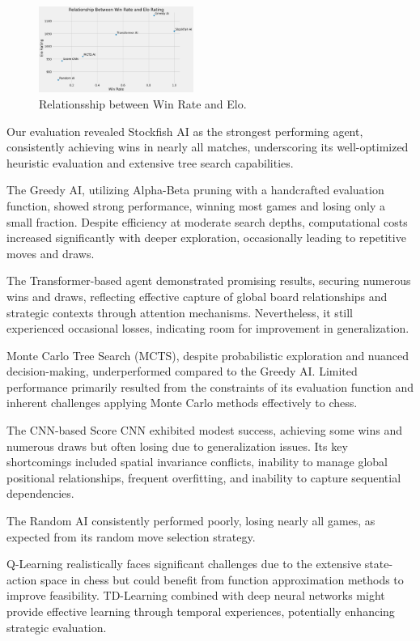 \documentclass[journal, a4paper]{IEEEtran}
\begin{document}
\begin{figure}[H]
    \centering
    \includegraphics[width=0.45\textwidth]{fig/winrate_elo.png}
    \caption{Relationsship between Win Rate and Elo.}
    \label{fig:win_rates}
\end{figure}

\noindent Our evaluation revealed Stockfish AI as the strongest performing agent, consistently achieving wins in nearly all matches, underscoring its well-optimized heuristic evaluation and extensive tree search capabilities.

The Greedy AI, utilizing Alpha-Beta pruning with a handcrafted evaluation function, showed strong performance, winning most games and losing only a small fraction. Despite efficiency at moderate search depths, computational costs increased significantly with deeper exploration, occasionally leading to repetitive moves and draws.

The Transformer-based agent demonstrated promising results, securing numerous wins and draws, reflecting effective capture of global board relationships and strategic contexts through attention mechanisms. Nevertheless, it still experienced occasional losses, indicating room for improvement in generalization.

Monte Carlo Tree Search (MCTS), despite probabilistic exploration and nuanced decision-making, underperformed compared to the Greedy AI. Limited performance primarily resulted from the constraints of its evaluation function and inherent challenges applying Monte Carlo methods effectively to chess.

The CNN-based Score CNN exhibited modest success, achieving some wins and numerous draws but often losing due to generalization issues. Its key shortcomings included spatial invariance conflicts, inability to manage global positional relationships, frequent overfitting, and inability to capture sequential dependencies.

The Random AI consistently performed poorly, losing nearly all games, as expected from its random move selection strategy.

Q-Learning realistically faces significant challenges due to the extensive state-action space in chess but could benefit from function approximation methods to improve feasibility. TD-Learning combined with deep neural networks might provide effective learning through temporal experiences, potentially enhancing strategic evaluation.
\end{document}
